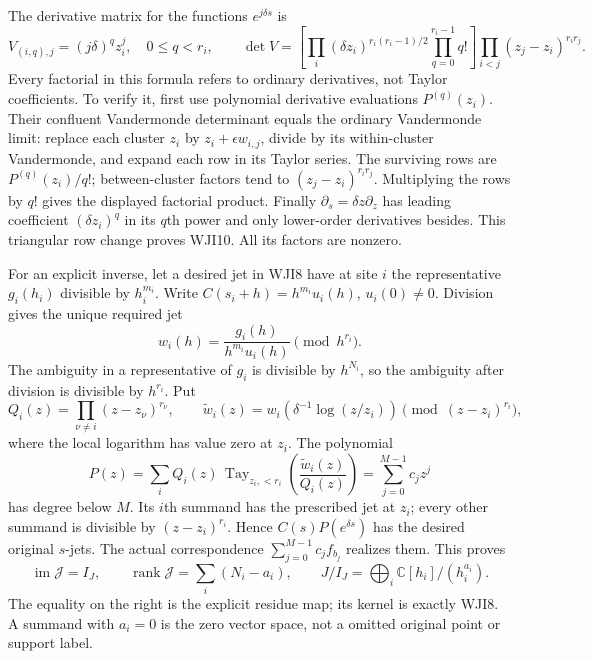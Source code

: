 \documentclass[11pt]{article}
\begin{document}
The derivative matrix for the functions $e^{j\delta s}$ is
\begin{equation}\tag{WJI10}
 V_{(i,q),j}=(j\delta)^q z_i^j,\quad 0\le q<r_i,\qquad
 \det V=
 \left[\prod_i(\delta z_i)^{r_i(r_i-1)/2}
                   \prod_{q=0}^{r_i-1}q!\right]
 \prod_{i<j}(z_j-z_i)^{r_i r_j}.
\end{equation}
Every factorial in this formula refers to ordinary derivatives,
not Taylor coefficients. To verify it, first use polynomial
derivative evaluations $P^{(q)}(z_i)$. Their confluent
Vandermonde determinant equals the ordinary Vandermonde limit:
replace each cluster $z_i$ by $z_i+\epsilon w_{i,j}$,
divide by its within-cluster Vandermonde, and expand each row
in its Taylor series. The surviving rows are
$P^{(q)}(z_i)/q!$; between-cluster factors tend to
$(z_j-z_i)^{r_i r_j}$. Multiplying the rows by $q!$ gives
the displayed factorial product. Finally
$\partial_s=\delta z\partial_z$ has leading coefficient
$(\delta z_i)^q$ in its $q$th power and only lower-order
derivatives besides. This triangular row change proves WJI10.
All its factors are nonzero.

For an explicit inverse, let a desired jet in WJI8 have at site
$i$ the representative $g_i(h_i)$ divisible by $h_i^{m_i}$.
Write $C(s_i+h)=h^{m_i}u_i(h)$, $u_i(0)\ne0$.
Division gives the unique required jet
\begin{equation}\tag{WJI11}
 w_i(h)=\frac{g_i(h)}{h^{m_i}u_i(h)}
                           \pmod {h^{r_i}}.
\end{equation}
The ambiguity in a representative of $g_i$ is divisible by
$h^{N_i}$, so the ambiguity after division is divisible by
$h^{r_i}$. Put
\[
 Q_i(z)=\prod_{\nu\ne i}(z-z_\nu)^{r_\nu},\qquad
 \widetilde w_i(z)=
       w_i\!\left(\delta^{-1}\log(z/z_i)\right)
                  \pmod{(z-z_i)^{r_i}},
\]
where the local logarithm has value zero at $z_i$. The polynomial
\begin{equation}\tag{WJI12}
 P(z)=\sum_i Q_i(z)\,
    \operatorname{Tay}_{z_i,<r_i}
             \left(\frac{\widetilde w_i(z)}{Q_i(z)}\right)
       =\sum_{j=0}^{M-1}c_jz^j
\end{equation}
has degree below $M$. Its $i$th summand has the prescribed
jet at $z_i$; every other summand is divisible by
$(z-z_i)^{r_i}$. Hence $C(s)P(e^{\delta s})$ has the
desired original $s$-jets. The actual correspondence
$\sum_{j=0}^{M-1}c_j f_{b_j}$ realizes them. This proves
\begin{equation}\tag{WJI13}
 \operatorname{im}\mathcal J=I_J,\qquad
 \operatorname{rank}\mathcal J=\sum_i(N_i-a_i),\qquad
 J/I_J=\bigoplus_i\mathbb C[h_i]/(h_i^{a_i}).
\end{equation}
The equality on the right is the explicit residue map; its
kernel is exactly WJI8. A summand with $a_i=0$ is the zero
vector space, not a omitted original point or support label.
\end{document}
